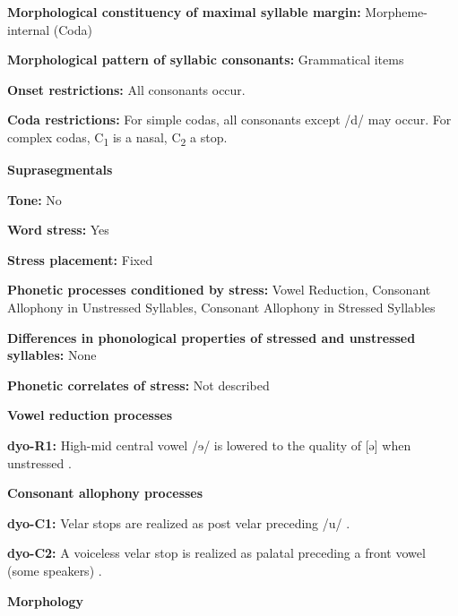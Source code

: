 \textbf{Morphological constituency of maximal syllable margin:} Morpheme-internal (Coda)



\textbf{Morphological pattern of syllabic consonants:} Grammatical items



\textbf{Onset restrictions:} All consonants occur.



\textbf{Coda restrictions:} For simple codas, all consonants except /d/ may occur. For complex codas, C\textsubscript{1} is a nasal, C\textsubscript{2} a stop.



\textbf{Suprasegmentals}



\textbf{Tone:} No



\textbf{Word stress:} Yes



\textbf{Stress placement:} Fixed



\textbf{Phonetic processes conditioned by stress:} Vowel Reduction, Consonant Allophony in Unstressed Syllables, Consonant Allophony in Stressed Syllables



\textbf{Differences in phonological properties of stressed and unstressed syllables:} None



\textbf{Phonetic correlates of stress:} Not described



\textbf{Vowel reduction processes}



\textbf{dyo-R1:} High-mid central vowel /ɘ/ is lowered to the quality of  [ə] when unstressed \citep[6]{Sapir1965}.



\textbf{Consonant allophony processes}



\textbf{dyo-C1:} Velar stops are realized as post velar preceding /u/ \citep[5]{Sapir1965}.



\textbf{dyo-C2:} A voiceless velar stop is realized as palatal preceding a front vowel (some speakers) \citep{Sapir1965}.



\textbf{Morphology}



